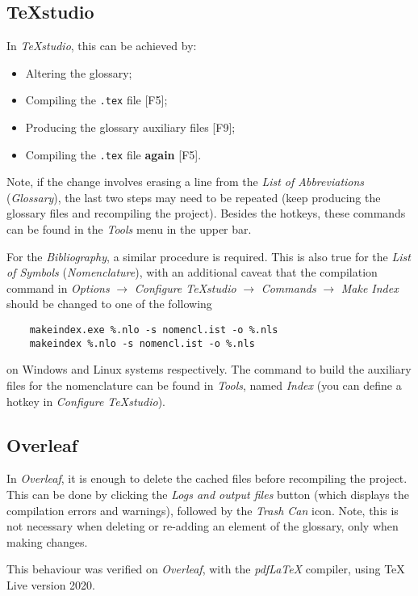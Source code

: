 \subsection{TeXstudio}

\noindent In \textit{TeXstudio}, this can be achieved by:
\begin{itemize}
	\item Altering the glossary;
	\item Compiling the \texttt{.tex} file [F5];
	\item Producing the glossary auxiliary files [F9];
	\item Compiling the \texttt{.tex} file \textbf{again} [F5].
\end{itemize}

\noindent Note, if the change involves erasing a line from the \textit{List of Abbreviations} (\textit{Glossary}), the last two steps may need to be repeated (keep producing the glossary files and recompiling the project). Besides the hotkeys, these commands can be found in the \textit{Tools} menu in the upper bar.

For the \textit{Bibliography}, a similar procedure is required. This is also true for the \textit{List of Symbols} (\textit{Nomenclature}), with an additional caveat that the compilation command in \textit{Options} $\rightarrow$ \textit{Configure TeXstudio} $\rightarrow$ \textit{Commands} $\rightarrow$ \textit{Make Index} should be changed to one of the following
\begin{verbatim}
	makeindex.exe %.nlo -s nomencl.ist -o %.nls
	makeindex %.nlo -s nomencl.ist -o %.nls
\end{verbatim}

\noindent on Windows and Linux systems respectively. The command to build the auxiliary files for the nomenclature can be found in \textit{Tools}, named \textit{Index} (you can define a hotkey in \textit{Configure TeXstudio}).

\subsection{Overleaf}

\noindent In \textit{Overleaf}, it is enough to delete the cached files before recompiling the project. This can be done by clicking the \textit{Logs and output files} button (which displays the compilation errors and warnings), followed by the \textit{Trash Can} icon. Note, this is not necessary when deleting or re-adding an element of the glossary, only when making changes.

This behaviour was verified on \textit{Overleaf}, with the \textit{pdfLaTeX} compiler, using TeX Live version 2020.


